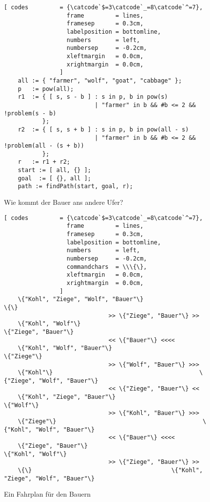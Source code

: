 \begin{figure}[!ht]
  \centering
\begin{Verbatim}[ codes         = {\catcode`$=3\catcode`_=8\catcode`^=7},
                  frame         = lines, 
                  framesep      = 0.3cm, 
                  labelposition = bottomline,
                  numbers       = left,
                  numbersep     = -0.2cm,
                  xleftmargin   = 0.0cm,
                  xrightmargin  = 0.0cm,
                ]
    all := { "farmer", "wolf", "goat", "cabbage" };
    p   := pow(all);
    r1  := { [ s, s - b ] : s in p, b in pow(s) 
                          | "farmer" in b && #b <= 2 && !problem(s - b) 
           };
    r2  := { [ s, s + b ] : s in p, b in pow(all - s) 
                          | "farmer" in b && #b <= 2 && !problem(all - (s + b))
           };
    r   := r1 + r2;
    start := [ all, {} ];
    goal  := [ {}, all ];
    path := findPath(start, goal, r);
\end{Verbatim} 
\vspace*{-0.3cm}
\caption{Wie kommt der Bauer ans andere Ufer?}  
\label{fig:wolf-ziege}
\end{figure} %
\noindent

\begin{figure}[!ht]
  \centering
\begin{Verbatim}[ codes         = {\catcode`$=3\catcode`_=8\catcode`^=7},
                  frame         = lines, 
                  framesep      = 0.3cm, 
                  labelposition = bottomline,
                  numbers       = left,
                  numbersep     = -0.2cm,
                  commandchars  = \\\{\},
                  xleftmargin   = 0.0cm,
                  xrightmargin  = 0.0cm,
                ]
    \{"Kohl", "Ziege", "Wolf", "Bauer"\}                                        \{\}
                              >> \{"Ziege", "Bauer"\} >>
    \{"Kohl", "Wolf"\}                                          \{"Ziege", "Bauer"\}
                              << \{"Bauer"\} <<<< 
    \{"Kohl", "Wolf", "Bauer"\}                                          \{"Ziege"\}
                              >> \{"Wolf", "Bauer"\} >>>
    \{"Kohl"\}                                          \{"Ziege", "Wolf", "Bauer"\}
                              << \{"Ziege", "Bauer"\} <<
    \{"Kohl", "Ziege", "Bauer"\}                                          \{"Wolf"\}
                              >> \{"Kohl", "Bauer"\} >>>
    \{"Ziege"\}                                          \{"Kohl", "Wolf", "Bauer"\}
                              << \{"Bauer"\} <<<< 
    \{"Ziege", "Bauer"\}                                          \{"Kohl", "Wolf"\}
                              >> \{"Ziege", "Bauer"\} >>    
    \{\}                                        \{"Kohl", "Ziege", "Wolf", "Bauer"\}
\end{Verbatim} 
\vspace*{-0.3cm}
\caption{Ein Fahrplan für den Bauern}  
\label{fig:wolf-ziege-solution}
\end{figure} %


